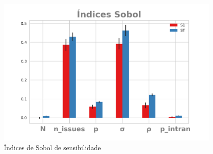 \begin{figure}[H]
  \centering
  \includegraphics{ims/barplotmuto5k.png}
  \caption{Índices de Sobol de sensibilidade}
  \label{fig:sobol1}
\end{figure}




















